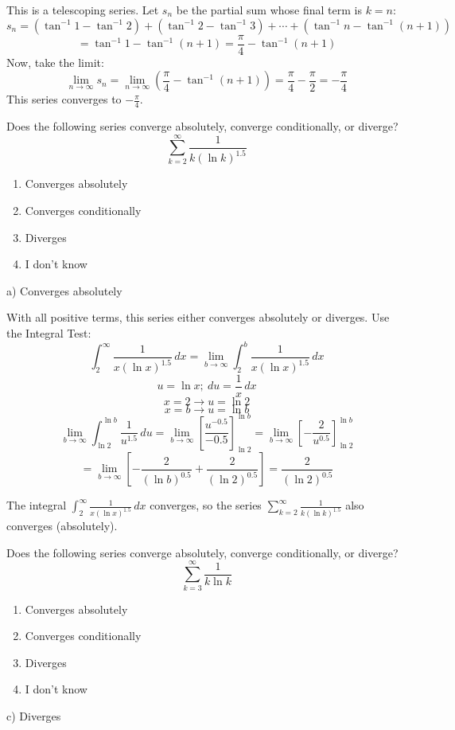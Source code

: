 \documentclass[addpoints,12pt,answers]{exam}
\begin{document}
\begin{questions}
\begin{solution}
    This is a telescoping series. Let $s_n$ be the partial sum whose final term is $k=n$:
    $$s_n=(\tan^{-1} 1-\tan^{-1} 2)+(\tan^{-1} 2-\tan^{-1} 3)+\cdots+(\tan^{-1} n-\tan^{-1}(n+1))$$
    $$=\tan^{-1} 1-\tan^{-1}(n+1)=\frac{\pi}{4}-\tan^{-1}(n+1)$$
    Now, take the limit:
    $$\lim_{n\to\infty}s_n=\lim_{n\to\infty}\left(\frac{\pi}{4}-\tan^{-1}(n+1)\right)=\frac{\pi}{4}-\frac{\pi}{2}=-\frac{\pi}{4}$$
    This series converges to $\displaystyle-\frac{\pi}{4}$.
  \end{solution}
  \newpage
  \question
  Does the following series converge absolutely, converge conditionally, or diverge?
  $$\sum_{k=2}^\infty\frac{1}{k(\ln k)^{1.5}}$$
  \begin{enumerate}[label=\alph*)]
    \item
    Converges absolutely
    \item
    Converges conditionally
    \item
    Diverges
    \item
    I don't know
  \end{enumerate}
  \begin{solution}
    a) Converges absolutely
    
    With all positive terms, this series either converges absolutely or diverges. Use the Integral Test:
    $$\int_2^\infty\frac{1}{x(\ln x)^{1.5}}\,dx=\lim_{b\to\infty}\int_2^b\frac{1}{x(\ln x)^{1.5}}\,dx$$
    $$u=\ln x; \ du=\frac{1}{x}\,dx$$
    $$x=2\longrightarrow u=\ln 2$$
    $$x=b\longrightarrow u=\ln b$$
    $$\lim_{b\to\infty}\int_{\ln 2}^{\ln b}\frac{1}{u^{1.5}}\,du=\lim_{b\to\infty}\left[\frac{u^{-0.5}}{-0.5}\right]_{\ln 2}^{\ln b}=\lim_{b\to\infty}\left[-\frac{2}{u^{0.5}}\right]_{\ln 2}^{\ln b}$$
    $$=\lim_{b\to\infty}\left[-\frac{2}{(\ln b)^{0.5}}+\frac{2}{(\ln 2)^{0.5}}\right]=\frac{2}{(\ln 2)^{0.5}}$$
      
    The integral $\displaystyle\int_2^\infty\frac{1}{x(\ln x)^{1.5}}\,dx$ converges, so the series $\displaystyle\sum_{k=2}^\infty \frac{1}{k(\ln k)^{1.5}}$ also converges (absolutely).
  \end{solution}
  \newpage
  \question
  Does the following series converge absolutely, converge conditionally, or diverge?
  $$\sum_{k=3}^\infty\frac{1}{k\ln k}$$
  \begin{enumerate}[label=\alph*)]
    \item
    Converges absolutely
    \item
    Converges conditionally
    \item
    Diverges
    \item
    I don't know
  \end{enumerate}
  \begin{solution}
    c) Diverges
        

\end{solution}
\end{questions}
\end{document}
